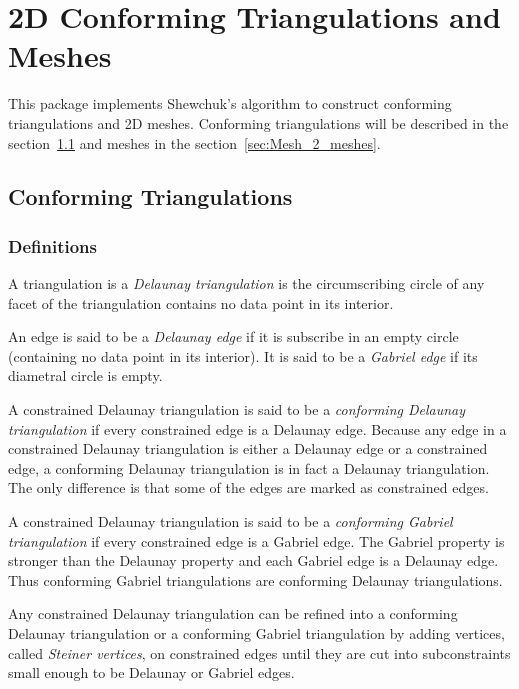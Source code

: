\chapter{2D Conforming Triangulations and Meshes}
\label{user_chapter_2D_Meshes}

\minitoc

This package implements Shewchuk's algorithm to construct conforming
triangulations and 2D meshes.  Conforming triangulations will be
described in the section~\ref{sec:Mesh_2_conforming_triangulation} and
meshes in the section~\ref{sec:Mesh_2_meshes}.

\section{Conforming Triangulations}
\label{sec:Mesh_2_conforming_triangulation}

\subsection{Definitions}
\label{sec:Mesh_2_conforming_definitions}

A triangulation is a \emph{Delaunay triangulation} is the circumscribing
circle of any facet of the triangulation contains no data point in its
interior.

An edge is said to be a \emph{Delaunay edge} if it is subscribe in an empty
circle (containing no data point in its interior). It is said to be a
\emph{Gabriel edge} if its diametral circle is empty.

A constrained Delaunay triangulation is said to be a \emph{conforming
  Delaunay triangulation} if every constrained edge is a Delaunay edge.
Because any edge in a constrained Delaunay triangulation is either a
Delaunay edge or a constrained edge, a conforming Delaunay triangulation is
in fact a Delaunay triangulation. The only difference is that some of the
edges are marked as constrained edges.

A constrained Delaunay triangulation is said to be a \emph{conforming
  Gabriel triangulation} if every constrained edge is a Gabriel edge. The
Gabriel property is stronger than the Delaunay property and each Gabriel
edge is a Delaunay edge. Thus conforming Gabriel triangulations are
conforming Delaunay triangulations.

Any constrained Delaunay triangulation can be refined into a
conforming Delaunay triangulation or a conforming Gabriel
triangulation by adding vertices, called \emph{Steiner vertices}, on
constrained edges until they are cut into subconstraints small enough
to be Delaunay or Gabriel edges.

